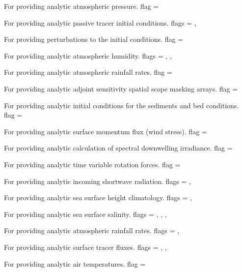 \begin{klist}
For providing analytic atmospheric pressure.
 flag = 

For providing analytic passive tracer initial conditions.
 flags = , 

For providing perturbations to the initial conditions.
 flag = 

For providing analytic atmospheric humidity.
 flags = , , 

For providing analytic atmospheric rainfall rates.
 flag = 

For providing analytic adjoint sensitivity spatial scope masking
arrays.
 flag = 

For providing analytic initial conditions for the sediments and bed
conditions.
 flag = 

For providing analytic surface momentum flux (wind stress).
 flag = 

For providing analytic calculation of spectral downwelling
irradiance.
 flag = 

For providing analytic time variable rotation forces.
 flag = 

For providing analytic incoming shortwave radiation.
 flags = , 

For providing analytic sea surface height climatology.
 flags = ,

For providing analytic sea surface salinity.
 flags = , , ,

For providing analytic atmospheric rainfall rates.
 flags = ,

For providing analytic surface tracer fluxes.
 flags = , ,

For providing analytic air temperatures.
 flag = 


\end{klist}
